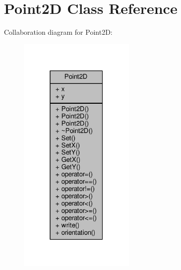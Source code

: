 \hypertarget{class_point2_d}{}\section{Point2D Class Reference}
\label{class_point2_d}


Collaboration diagram for Point2D\+:
\nopagebreak
\begin{figure}[H]
\begin{center}
\leavevmode
\includegraphics[width=159pt]{class_point2_d__coll__graph}
\end{center}
\end{figure}
